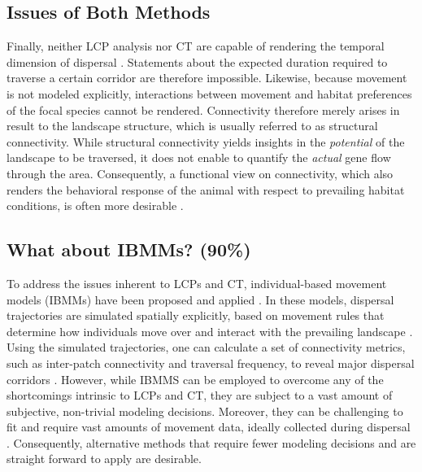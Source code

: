 \documentclass[abstract=on,10pt,a4paper,bibliography=totocnumbered]{article}
\begin{document}
\subsection{Issues of Both Methods}
Finally, neither LCP analysis nor CT are capable of rendering the temporal
dimension of dispersal \citep{Diniz.2020}. Statements about the expected
duration required to traverse a certain corridor are therefore impossible.
Likewise, because movement is not modeled explicitly, interactions between
movement and habitat preferences of the focal species cannot be rendered.
Connectivity therefore merely arises in result to the landscape structure, which
is usually referred to as structural connectivity. While structural connectivity
yields insights in the \textit{potential} of the landscape to be traversed, it
does not enable to quantify the \textit{actual} gene flow through the area.
Consequently, a functional view on connectivity, which also renders the
behavioral response of the animal with respect to prevailing habitat conditions,
is often more desirable \citep{Tischendorf.2000, Baguette.2013}.

\subsection{What about IBMMs? (90\%)}
To address the issues inherent to LCPs and CT, individual-based movement models
(IBMMs) have been proposed and applied \citep{Diniz.2020}. In these models,
dispersal trajectories are simulated spatially explicitly, based on movement
rules that determine how individuals move over and interact with the prevailing
landscape \citep{Gustafson.1996, Gardner.2004, Graf.2007, KramerSchadt.2004,
Revilla.2004, Revilla.2008, Kanagaraj.2013, Clark.2015, Allen.2016,
Hauenstein.2019, Zeller.2020, Vasudev.2021}. Using the simulated trajectories,
one can calculate a set of connectivity metrics, such as inter-patch
connectivity and traversal frequency, to reveal major dispersal corridors
\citep{Kanagaraj.2013, BastilleRousseau.2018, Hauenstein.2019, Zeller.2020}.
However, while IBMMS can be employed to overcome any of the shortcomings
intrinsic to LCPs and CT, they are subject to a vast amount of subjective,
non-trivial modeling decisions. Moreover, they can be challenging to fit and
require vast amounts of movement data, ideally collected during dispersal
\citep{Diniz.2020}. Consequently, alternative methods that require fewer
modeling decisions and are straight forward to apply are desirable.
\end{document}
